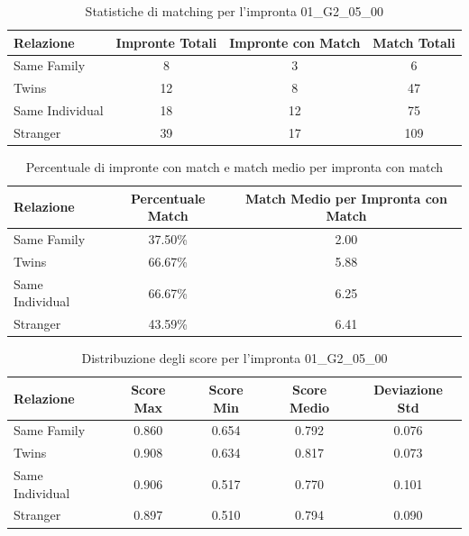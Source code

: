 \begin{table}[htbp]
\centering
\caption{Statistiche di matching per l'impronta 01\_G2\_05\_00}
\label{tab:results_01_G2_05_00}
\begin{tabular}{|l|c|c|c|}
\hline
\textbf{Relazione} & \textbf{Impronte Totali} & \textbf{Impronte con Match} & \textbf{Match Totali} \\
\hline
Same Family & 8 & 3 & 6 \\
\hline
Twins & 12 & 8 & 47 \\
\hline
Same Individual & 18 & 12 & 75 \\
\hline
Stranger & 39 & 17 & 109 \\
\hline
\end{tabular}
\end{table}


\begin{table}[htbp]
\centering
\caption{Percentuale di impronte con match e match medio per impronta con match}
\label{tab:match_percentage_01_G2_05_00}
\begin{tabular}{|l|c|c|}
\hline
\textbf{Relazione} & \textbf{Percentuale Match} & \textbf{Match Medio per Impronta con Match} \\
\hline
Same Family & 37.50\% & 2.00 \\
\hline
Twins & 66.67\% & 5.88 \\
\hline
Same Individual & 66.67\% & 6.25 \\
\hline
Stranger & 43.59\% & 6.41 \\
\hline
\end{tabular}
\end{table}


\begin{table}[htbp]
\centering
\caption{Distribuzione degli score per l'impronta 01\_G2\_05\_00}
\label{tab:scores_01_G2_05_00}
\begin{tabular}{|l|c|c|c|c|}
\hline
\textbf{Relazione} & \textbf{Score Max} & \textbf{Score Min} & \textbf{Score Medio} & \textbf{Deviazione Std} \\
\hline
Same Family & 0.860 & 0.654 & 0.792 & 0.076 \\
\hline
Twins & 0.908 & 0.634 & 0.817 & 0.073 \\
\hline
Same Individual & 0.906 & 0.517 & 0.770 & 0.101 \\
\hline
Stranger & 0.897 & 0.510 & 0.794 & 0.090 \\
\hline
\end{tabular}
\end{table}

